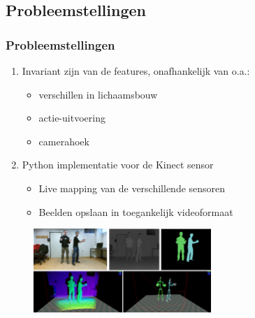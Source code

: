 \documentclass[]{beamer}
\begin{document}
	\subsection{Probleemstellingen}
	\begin{frame}
	\frametitle{Probleemstellingen}

		\begin{enumerate}
			\item<1- > Invariant zijn van de features, onafhankelijk van o.a.:
				\begin{itemize}
				\item verschillen in lichaamsbouw
				\item actie-uitvoering
				\item camerahoek
				\end{itemize}
			\item<2- > Python implementatie voor de Kinect sensor
				\begin{itemize}
				\item Live mapping van de verschillende sensoren
				\item Beelden opslaan in toegankelijk videoformaat
				\end{itemize}
			
		\end{enumerate}
		\begin{figure}
			\includegraphics[width=0.6\textwidth]{sensoren}
		\end{figure}

	\end{frame}
	
\end{document}
